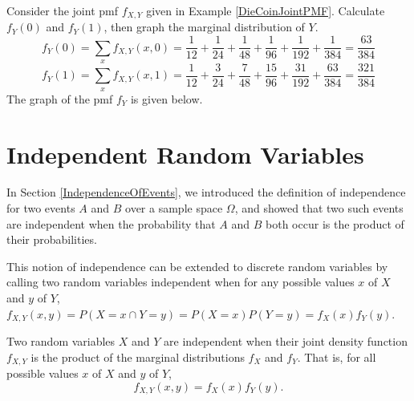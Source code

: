 \begin{examp}Consider the joint pmf $f_{X,Y}$ given in Example \ref{DieCoinJointPMF}. Calculate $f_{Y}(0)$ and $f_Y(1)$, then graph the marginal distribution of $Y$.
$$f_Y(0) = \sum_{x} f_{X,Y}(x,0) = \frac{1}{12} + \frac{1}{24} + \frac{1}{48} + \frac{1}{96} + \frac{1}{192} + \frac{1}{384} = \frac{63}{384}$$
$$f_Y(1) = \sum_{x} f_{X,Y}(x,1) = \frac{1}{12} + \frac{3}{24} + \frac{7}{48} + \frac{15}{96} + \frac{31}{192} + \frac{63}{384} = \frac{321}{384} $$
The graph of the pmf $f_Y$ is given below.
\begin{center}
\end{center}
\end{examp}

\section{Independent Random Variables}

In Section \ref{IndependenceOfEvents}, we introduced the definition of independence for two events $A$ and $B$ over a sample space $\Omega$, and showed that two such events are independent when the probability that $A$ and $B$ both occur is the product of their probabilities.
\par
This notion of independence can be extended to discrete random variables by calling two random variables independent when for any possible values $x$ of $X$ and $y$ of $Y$, $f_{X,Y}(x,y) = P(X = x \cap  Y = y) = P(X = x)P(Y = y) = f_{X}(x)f_Y(y)$.

\begin{defn}\label{independentrvdef}
Two random variables $X$ and $Y$ are independent when their joint density function $f_{X,Y}$ is the product of the marginal distributions $f_X$ and $f_Y$. That is, for all possible values $x$ of $X$ and $y$ of $Y$, 
$$f_{X,Y}(x,y) = f_{X}(x)f_Y(y).$$
\end{defn}

